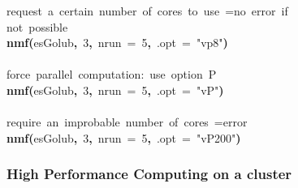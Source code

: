 \documentclass[a4paper]{article}\usepackage{graphicx, color}
\makeatletter
\newcommand{\hlnumber}[1]{\textcolor[rgb]{0,0,0}{#1}}%
\newcommand{\hlfunctioncall}[1]{\textcolor[rgb]{0.501960784313725,0,0.329411764705882}{\textbf{#1}}}%
\newcommand{\hlstring}[1]{\textcolor[rgb]{0.6,0.6,1}{#1}}%
\newcommand{\hlkeyword}[1]{\textcolor[rgb]{0,0,0}{\textbf{#1}}}%
\newcommand{\hlargument}[1]{\textcolor[rgb]{0.690196078431373,0.250980392156863,0.0196078431372549}{#1}}%
\newcommand{\hlcomment}[1]{\textcolor[rgb]{0.180392156862745,0.6,0.341176470588235}{#1}}%
\newcommand{\hlsymbol}[1]{\textcolor[rgb]{0,0,0}{#1}}%
\newcommand{\hlstd}[1]{\textcolor[rgb]{0,0,0}{#1}}%
\newenvironment{kframe}{%
 \def\FrameCommand##1{\hskip\@totalleftmargin \hskip-\fboxsep
 \colorbox{shadecolor}{##1}\hskip-\fboxsep
     \hskip-\linewidth \hskip-\@totalleftmargin \hskip\columnwidth}%
 \MakeFramed {\advance\hsize-\width
   \@totalleftmargin\z@ \linewidth\hsize
   \@setminipage}}%
 {\par\unskip\endMakeFramed}
\newenvironment{knitrout}{}{} %
\makeatother
\begin{document}
\begin{knitrout}
\color{fgcolor}\begin{kframe}
\begin{flushleft}
\ttfamily\noindent
\hlcomment{\usebox{\hlnormalsizeboxhash}{\ }request{\ }a{\ }certain{\ }number{\ }of{\ }cores{\ }to{\ }use{\ }=\usebox{\hlnormalsizeboxgreaterthan}{\ }no{\ }error{\ }if}\hspace*{\fill}\\
\hlstd{}\hlcomment{\usebox{\hlnormalsizeboxhash}{\ }not{\ }possible}\hspace*{\fill}\\
\hlstd{}\hlfunctioncall{nmf}\hlkeyword{(}\hlsymbol{esGolub}\hlkeyword{,}{\ }\hlnumber{3}\hlkeyword{,}{\ }\hlargument{nrun}{\ }\hlargument{=}{\ }\hlnumber{5}\hlkeyword{,}{\ }\hlargument{.opt}{\ }\hlargument{=}{\ }\hlstring{"{}vp8"{}}\hlkeyword{)}\hspace*{\fill}\\
\hlstd{}\hspace*{\fill}\\
\hlstd{}\hlcomment{\usebox{\hlnormalsizeboxhash}{\ }force{\ }parallel{\ }computation:{\ }use{\ }option{\ }\usebox{\hlnormalsizeboxsinglequote}P\usebox{\hlnormalsizeboxsinglequote}}\hspace*{\fill}\\
\hlstd{}\hlfunctioncall{nmf}\hlkeyword{(}\hlsymbol{esGolub}\hlkeyword{,}{\ }\hlnumber{3}\hlkeyword{,}{\ }\hlargument{nrun}{\ }\hlargument{=}{\ }\hlnumber{5}\hlkeyword{,}{\ }\hlargument{.opt}{\ }\hlargument{=}{\ }\hlstring{"{}vP"{}}\hlkeyword{)}\hspace*{\fill}\\
\hlstd{}\hspace*{\fill}\\
\hlstd{}\hlcomment{\usebox{\hlnormalsizeboxhash}{\ }require{\ }an{\ }improbable{\ }number{\ }of{\ }cores{\ }=\usebox{\hlnormalsizeboxgreaterthan}{\ }error}\hspace*{\fill}\\
\hlstd{}\hlfunctioncall{nmf}\hlkeyword{(}\hlsymbol{esGolub}\hlkeyword{,}{\ }\hlnumber{3}\hlkeyword{,}{\ }\hlargument{nrun}{\ }\hlargument{=}{\ }\hlnumber{5}\hlkeyword{,}{\ }\hlargument{.opt}{\ }\hlargument{=}{\ }\hlstring{"{}vP200"{}}\hlkeyword{)}\mbox{}
\normalfont
\end{flushleft}
\end{kframe}
\end{knitrout}


\subsubsection{High Performance Computing on a cluster}
\end{document}
